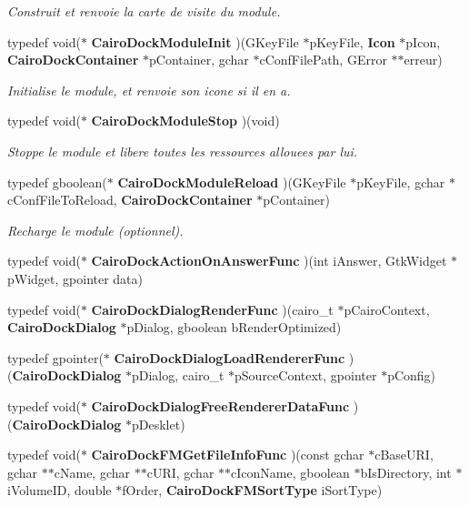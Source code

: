 \begin{CompactItemize}
\begin{CompactList}\small\item\em Construit et renvoie la carte de visite du module. \item\end{CompactList}\item 
typedef void($\ast$ {\bf CairoDockModuleInit} )(GKeyFile $\ast$pKeyFile, {\bf Icon} $\ast$pIcon, {\bf CairoDockContainer} $\ast$pContainer, gchar $\ast$cConfFilePath, GError $\ast$$\ast$erreur)
\begin{CompactList}\small\item\em Initialise le module, et renvoie son icone si il en a. \item\end{CompactList}\item 
typedef void($\ast$ {\bf CairoDockModuleStop} )(void)
\begin{CompactList}\small\item\em Stoppe le module et libere toutes les ressources allouees par lui. \item\end{CompactList}\item 
typedef gboolean($\ast$ {\bf CairoDockModuleReload} )(GKeyFile $\ast$pKeyFile, gchar $\ast$cConfFileToReload, {\bf CairoDockContainer} $\ast$pContainer)
\begin{CompactList}\small\item\em Recharge le module (optionnel). \item\end{CompactList}\item 
typedef void($\ast$ {\bf CairoDockActionOnAnswerFunc} )(int iAnswer, GtkWidget $\ast$pWidget, gpointer data)
\item 
typedef void($\ast$ {\bf CairoDockDialogRenderFunc} )(cairo\_\-t $\ast$pCairoContext, {\bf CairoDockDialog} $\ast$pDialog, gboolean bRenderOptimized)
\item 
typedef gpointer($\ast$ {\bf CairoDockDialogLoadRendererFunc} )({\bf CairoDockDialog} $\ast$pDialog, cairo\_\-t $\ast$pSourceContext, gpointer $\ast$pConfig)
\item 
typedef void($\ast$ {\bf CairoDockDialogFreeRendererDataFunc} )({\bf CairoDockDialog} $\ast$pDesklet)
\item 
typedef void($\ast$ {\bf CairoDockFMGetFileInfoFunc} )(const gchar $\ast$cBaseURI, gchar $\ast$$\ast$cName, gchar $\ast$$\ast$cURI, gchar $\ast$$\ast$cIconName, gboolean $\ast$bIsDirectory, int $\ast$iVolumeID, double $\ast$fOrder, {\bf CairoDockFMSortType} iSortType)

\end{CompactItemize}
